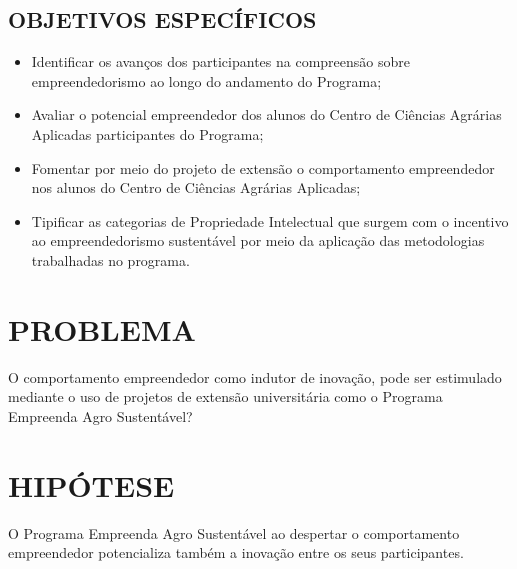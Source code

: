 \subsection{OBJETIVOS ESPECÍFICOS}

\begin{itemize}
\item{Identificar os avanços dos participantes na compreensão sobre empreendedorismo ao longo do andamento do Programa;}

\item {Avaliar o potencial empreendedor dos alunos do Centro de Ciências Agrárias Aplicadas participantes do Programa;}
\item {Fomentar por meio do projeto de extensão o comportamento empreendedor nos alunos do Centro de Ciências Agrárias Aplicadas;}
\item {Tipificar as categorias de Propriedade Intelectual que surgem com o incentivo ao empreendedorismo sustentável por meio da aplicação das metodologias trabalhadas no programa.}
\end{itemize}


\section{PROBLEMA}

O comportamento empreendedor como indutor de inovação, pode ser estimulado mediante o uso de projetos de extensão universitária como o Programa Empreenda Agro Sustentável? 


\section{HIPÓTESE}

O Programa Empreenda Agro Sustentável ao despertar o comportamento empreendedor potencializa também a inovação entre os seus participantes.



